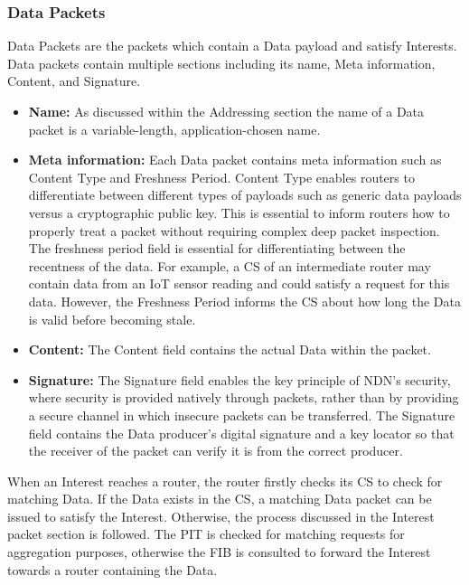 \documentclass[12pt]{report}
\begin{document}
\subsubsection{Data Packets}
Data Packets are the packets which contain a Data payload and satisfy Interests. Data packets contain multiple sections including its name, Meta information, Content, and Signature. 
\begin{itemize}
    \item \textbf{Name:} As discussed within the Addressing section the name of a Data packet is a variable-length, application-chosen name.
    \item \textbf{Meta information:} Each Data packet contains meta information such as Content Type and Freshness Period. Content Type enables routers to differentiate between different types of payloads such as generic data payloads versus a cryptographic public key. This is essential to inform routers how to properly treat a packet without requiring complex deep packet inspection. The freshness period field is essential for differentiating between the recentness of the data. For example, a CS of an intermediate router may contain data from an IoT sensor reading and could satisfy a request for this data. However, the Freshness Period informs the CS about how long the Data is valid before becoming stale.
    \item \textbf{Content:} The Content field contains the actual Data within the packet. 
    \item \textbf{Signature:} The Signature field enables the key principle of NDN's security, where security is provided natively through packets, rather than by providing a secure channel in which insecure packets can be transferred. The Signature field contains the Data producer's digital signature and a key locator so that the receiver of the packet can verify it is from the correct producer.
\end{itemize}


When an Interest reaches a router, the router firstly checks its CS to check for matching Data. If the Data exists in the CS, a matching Data packet can be issued to satisfy the Interest. Otherwise, the process discussed in the Interest packet section is followed. The PIT is checked for matching requests for aggregation purposes, otherwise the FIB is consulted to forward the Interest towards a router containing the Data.
\end{document}
